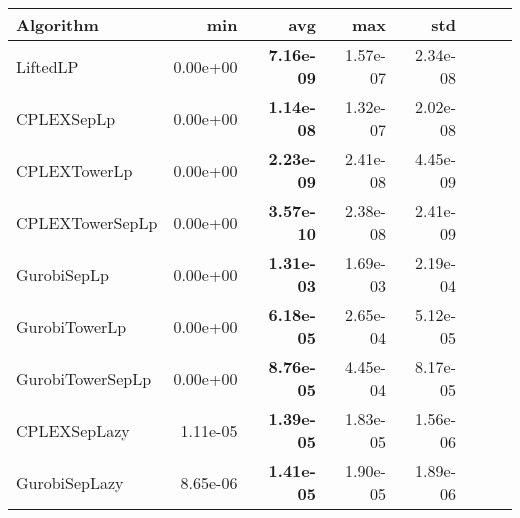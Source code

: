 \begin{tabular}{lrrrrrrr}
Algorithm & min & avg & max & std
\\
\hline
LiftedLP&0.00e+00& \bf7.16e-09& 1.57e-07& 2.34e-08\\
CPLEXSepLp&0.00e+00& \bf1.14e-08& 1.32e-07& 2.02e-08\\
CPLEXTowerLp&0.00e+00& \bf2.23e-09& 2.41e-08& 4.45e-09\\
CPLEXTowerSepLp&0.00e+00& \bf3.57e-10& 2.38e-08& 2.41e-09\\
GurobiSepLp&0.00e+00& \bf1.31e-03& 1.69e-03& 2.19e-04\\
GurobiTowerLp&0.00e+00& \bf6.18e-05& 2.65e-04& 5.12e-05\\
GurobiTowerSepLp&0.00e+00& \bf8.76e-05& 4.45e-04& 8.17e-05\\
CPLEXSepLazy&1.11e-05& \bf1.39e-05& 1.83e-05& 1.56e-06\\
GurobiSepLazy&8.65e-06& \bf1.41e-05& 1.90e-05& 1.89e-06
\end{tabular}
